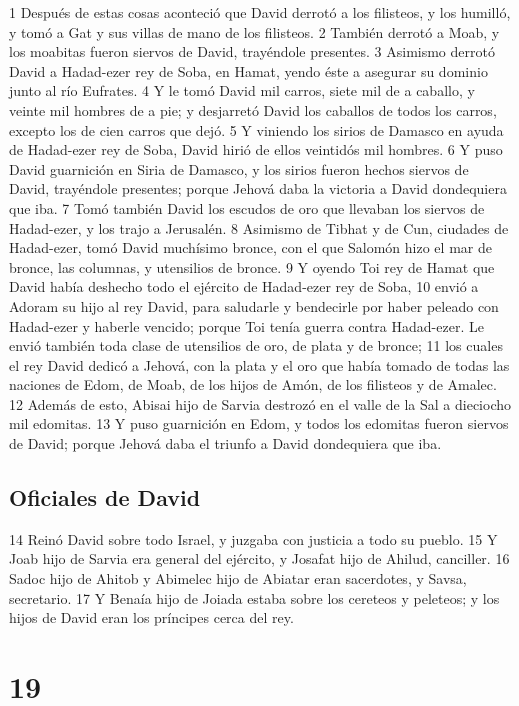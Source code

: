 1 Después de estas cosas aconteció que David derrotó a los filisteos, y los humilló, y tomó a Gat y sus villas de mano de los filisteos.
2 También derrotó a Moab, y los moabitas fueron siervos de David, trayéndole presentes.
3 Asimismo derrotó David a Hadad-ezer rey de Soba, en Hamat, yendo éste a asegurar su dominio junto al río Eufrates.
4 Y le tomó David mil carros, siete mil de a caballo, y veinte mil hombres de a pie; y desjarretó David los caballos de todos los carros, excepto los de cien carros que dejó.
5 Y viniendo los sirios de Damasco en ayuda de Hadad-ezer rey de Soba, David hirió de ellos veintidós mil hombres.
6 Y puso David guarnición en Siria de Damasco, y los sirios fueron hechos siervos de David, trayéndole presentes; porque Jehová daba la victoria a David dondequiera que iba.
7 Tomó también David los escudos de oro que llevaban los siervos de Hadad-ezer, y los trajo a Jerusalén.
8 Asimismo de Tibhat y de Cun, ciudades de Hadad-ezer, tomó David muchísimo bronce, con el que Salomón hizo el mar de bronce, las columnas, y utensilios de bronce. 
9 Y oyendo Toi rey de Hamat que David había deshecho todo el ejército de Hadad-ezer rey de Soba,
10 envió a Adoram su hijo al rey David, para saludarle y bendecirle por haber peleado con Hadad-ezer y haberle vencido; porque Toi tenía guerra contra Hadad-ezer. Le envió también toda clase de utensilios de oro, de plata y de bronce;
11 los cuales el rey David dedicó a Jehová, con la plata y el oro que había tomado de todas las naciones de Edom, de Moab, de los hijos de Amón, de los filisteos y de Amalec.
12 Además de esto, Abisai hijo de Sarvia destrozó en el valle de la Sal a dieciocho mil edomitas. 
13 Y puso guarnición en Edom, y todos los edomitas fueron siervos de David; porque Jehová daba el triunfo a David dondequiera que iba.

\section*{Oficiales de David}

14 Reinó David sobre todo Israel, y juzgaba con justicia a todo su pueblo.
15 Y Joab hijo de Sarvia era general del ejército, y Josafat hijo de Ahilud, canciller.
16 Sadoc hijo de Ahitob y Abimelec hijo de Abiatar eran sacerdotes, y Savsa, secretario.
17 Y Benaía hijo de Joiada estaba sobre los cereteos y peleteos; y los hijos de David eran los príncipes cerca del rey. 

\chapter{19}

